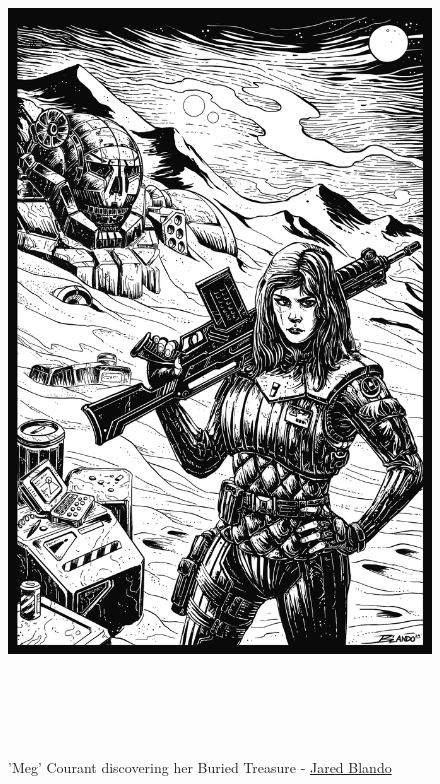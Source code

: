 \begin{figure}[!h]
  \centering
  \href{https://jaredblando.com/}{\includegraphics[alt='MechWarrior finding buried Atlas', width=5.5in, height=8.5in]{img/Buried-Treasure.png}}
  \caption*{'Meg' Courant discovering her Buried Treasure - \href{https://jaredblando.com/}{Jared Blando}}
\end{figure}
